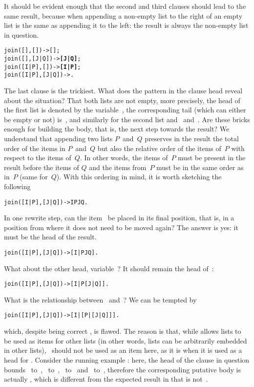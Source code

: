 It should be evident enough that the second and third clauses should
lead to the same result, because when appending a non\hyp{}empty list
to the right of an empty list is the same as appending it to the left:
the result is always the non\hyp{}empty list in question.
\begin{alltt}
join(   [],   []) -> [];
join(   [],[J|Q]) -> \textbf{[J|Q]};\hfill% \emph{Clause symmetrical...}
join([I|P],   []) -> \textbf{[I|P]};\hfill% \emph{...to this one.}
join([I|P],[J|Q]) -> \fbcode{[I|join(P,[J|Q])]}.
\end{alltt}
The last clause is the trickiest. What does the pattern in the clause
head reveal about the situation? That both lists are not empty, more
precisely, the head of the first list is denoted by the
variable~, the corresponding tail (which can either be
empty or not) is~, and similarly for the second list and
~and~. Are these bricks enough for building the
body, that is, the next step towards the result? We understand that
appending two lists \(P\)~and~\(Q\) preserves in the result the total
order of the items in \(P\)~and~\(Q\) but also the relative order of
the items of~\(P\) with respect to the items of~\(Q\). In other words,
the items of~\(P\) must be present in the result before the items of
\(Q\) and the items from~\(P\) must be in the same order as in~\(P\)
(same for~\(Q\)). With this ordering in mind, it is worth sketching
the following
\begin{alltt}
join([I|P],[J|Q]) ->  I  P  J  Q .
\end{alltt}
In one rewrite step, can the item~ be placed in its final
position, that is, in a position from where it does not need to be
moved again?  The answer is yes: it must be the head of the
result. 
\begin{alltt}
join([I|P],[J|Q]) -> [I |  P  J  Q ].
\end{alltt}
What about the other head, variable~? It should remain the
head of~:
\begin{alltt}
join([I|P],[J|Q]) -> [I |  P  [J | Q]].
\end{alltt}
What is the relationship between ~and~\erlcode{[J|Q]}? We
can be tempted by
\begin{alltt}
join([I|P],[J|Q]) -> [I | [P | [J | Q]]].\hfill% ?
\end{alltt}
which, despite being correct \Erlang, is flawed. The reason is that,
while \Erlang allows lists to be used as items for other lists (in
other words, lists can be arbitrarily embedded in other lists),
~should not be used as an item here, as it is when it is
used as a head for \erlcode{[J|Q]}. Consider the running example
: here, the head of the clause in
question bounds ~to~,
~to~\erlcode{[5|[]]}, ~to~ and
~to~\erlcode{[]}, therefore the corresponding putative body
 is actually
, which is different from the
expected result  in that
\erlcode{[5|[]]} is not~.

